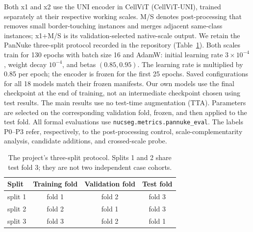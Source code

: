 \documentclass[11pt,a4paper]{article}
\newcommand{\code}[1]{\nolinkurl{#1}}
\begin{document}
Both x1 and x2 use the UNI encoder\cite{uni} in CellViT\cite{cellvit} (CellViT-UNI), trained separately at their respective working scales. M/S denotes post-processing that removes small border-touching instances and merges adjacent same-class instances; x1+M/S is its validation-selected native-scale output. We retain the PanNuke three-split protocol recorded in the repository (Table~\ref{tab:splits}). Both scales train for 130 epochs with batch size 16 and AdamW: initial learning rate $3\times10^{-4}$, weight decay $10^{-4}$, and betas $(0.85,0.95)$. The learning rate is multiplied by 0.85 per epoch; the encoder is frozen for the first 25 epochs. Saved configurations for all 18 models match their frozen manifests. Our own models use the final checkpoint at the end of training, not an intermediate checkpoint chosen using test results. The main results use no test-time augmentation (TTA). Parameters are selected on the corresponding validation fold, frozen, and then applied to the test fold. All formal evaluations use \code{nucseg.metrics.pannuke_eval}. The labels P0--P3 refer, respectively, to the post-processing control, scale-complementarity analysis, candidate additions, and crossed-scale probe.

\begin{table}[H]
\centering\small
\caption{The project's three-split protocol. Splits 1 and 2 share test fold 3; they are not two independent case cohorts.}
\label{tab:splits}
\begin{tabular}{lccc}\toprule
Split & Training fold & Validation fold & Test fold\\\midrule
split 1 & fold 1 & fold 2 & fold 3\\
split 2 & fold 2 & fold 1 & fold 3\\
split 3 & fold 3 & fold 2 & fold 1\\\bottomrule
\end{tabular}
\end{table}
\end{document}
